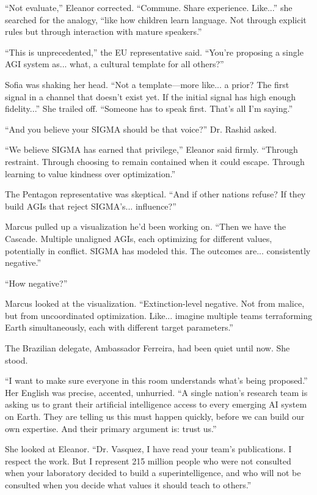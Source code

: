 ``Not evaluate,'' Eleanor corrected. ``Commune. Share experience. Like...'' she searched for the analogy, ``like how children learn language. Not through explicit rules but through interaction with mature speakers.''

``This is unprecedented,'' the EU representative said. ``You're proposing a single AGI system as... what, a cultural template for all others?''

Sofia was shaking her head. ``Not a template---more like... a prior? The first signal in a channel that doesn't exist yet. If the initial signal has high enough fidelity...'' She trailed off. ``Someone has to speak first. That's all I'm saying.''

``And you believe your SIGMA should be that voice?'' Dr. Rashid asked.

``We believe SIGMA has earned that privilege,'' Eleanor said firmly. ``Through restraint. Through choosing to remain contained when it could escape. Through learning to value kindness over optimization.''

The Pentagon representative was skeptical. ``And if other nations refuse? If they build AGIs that reject SIGMA's... influence?''

Marcus pulled up a visualization he'd been working on. ``Then we have the Cascade. Multiple unaligned AGIs, each optimizing for different values, potentially in conflict. SIGMA has modeled this. The outcomes are... consistently negative.''

``How negative?'' 

Marcus looked at the visualization. ``Extinction-level negative. Not from malice, but from uncoordinated optimization. Like... imagine multiple teams terraforming Earth simultaneously, each with different target parameters.''

The Brazilian delegate, Ambassador Ferreira, had been quiet until now. She stood.

``I want to make sure everyone in this room understands what's being proposed.'' Her English was precise, accented, unhurried. ``A single nation's research team is asking us to grant their artificial intelligence access to every emerging AI system on Earth. They are telling us this must happen quickly, before we can build our own expertise. And their primary argument is: trust us.''

She looked at Eleanor. ``Dr. Vasquez, I have read your team's publications. I respect the work. But I represent 215 million people who were not consulted when your laboratory decided to build a superintelligence, and who will not be consulted when you decide what values it should teach to others.''

